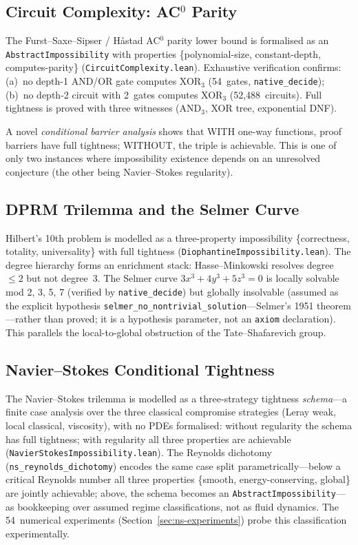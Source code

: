 \documentclass[11pt,a4paper]{article}
\begin{document}
\subsection{Circuit Complexity: AC$^0$ Parity}

The Furst--Saxe--Sipser / H\aa stad AC$^0$ parity lower bound is formalised as an \texttt{AbstractImpossibility} with properties \{polynomial-size, constant-depth, computes-parity\} (\texttt{CircuitComplexity.lean}).  Exhaustive verification confirms: (a)~no depth-1 AND/OR gate computes XOR$_3$ (54~gates, \texttt{native\_decide}); (b)~no depth-2 circuit with 2~gates computes XOR$_3$ (52,488~circuits).  Full tightness is proved with three witnesses (AND$_3$, XOR tree, exponential DNF).

A novel \emph{conditional barrier analysis} shows that WITH one-way functions, proof barriers have full tightness; WITHOUT, the triple is achievable.  This is one of only two instances where impossibility existence depends on an unresolved conjecture (the other being Navier--Stokes regularity).

\subsection{DPRM Trilemma and the Selmer Curve}

Hilbert's 10th problem is modelled as a three-property impossibility \{correctness, totality, universality\} with full tightness (\texttt{DiophantineImpossibility.lean}).  The degree hierarchy forms an enrichment stack: Hasse--Minkowski resolves degree~$\leq 2$ but not degree~3.  The Selmer curve $3x^3 + 4y^3 + 5z^3 = 0$ is locally solvable mod 2, 3, 5, 7 (verified by \texttt{native\_decide}) but globally insolvable (assumed as the explicit hypothesis \texttt{selmer\_no\_nontrivial\_solution}---Selmer's 1951 theorem---rather than proved; it is a hypothesis parameter, not an \texttt{axiom} declaration).  This parallels the local-to-global obstruction of the Tate--Shafarevich group.

\subsection{Navier--Stokes Conditional Tightness}

The Navier--Stokes trilemma is modelled as a three-strategy tightness \emph{schema}---a finite case analysis over the three classical compromise strategies (Leray weak, local classical, viscosity), with no PDEs formalised: without regularity the schema has full tightness; with regularity all three properties are achievable (\texttt{NavierStokesImpossibility.lean}).  The Reynolds dichotomy (\texttt{ns\_reynolds\_dichotomy}) encodes the same case split parametrically---below a critical Reynolds number all three properties \{smooth, energy-conserving, global\} are jointly achievable; above, the schema becomes an \texttt{AbstractImpossibility}---as bookkeeping over assumed regime classifications, not as fluid dynamics.  The 54~numerical experiments (Section~\ref{sec:ns-experiments}) probe this classification experimentally.
\end{document}
